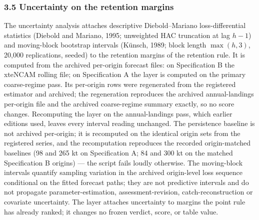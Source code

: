 \documentclass[11pt]{article}
\begin{document}
\subsubsection{3.5 Uncertainty on the retention
margins}\label{uncertainty-on-the-retention-margins}

The uncertainty analysis attaches descriptive Diebold--Mariano loss-differential statistics
(Diebold and Mariano, 1995; unweighted HAC truncation at lag \(h-1\)) and
moving-block bootstrap intervals (K\"unsch, 1989; block length
\(\max(h,3)\), 20,000 replications, seeded) to the retention margins of
the retention rule. It is computed from the archived per-origin forecast
files: on Specification B the xteNCAM rolling file; on Specification A
the layer is computed on the primary coarse-regime pass. Its per-origin
rows were regenerated from the registered estimator and archived; the
regeneration reproduces the archived annual-landings per-origin file
and the archived coarse-regime summary exactly, so no score changes.
Recomputing the layer on the annual-landings pass, which earlier
editions used, leaves every interval reading unchanged.
The persistence baseline is not archived per-origin; it is recomputed on the
identical origin sets from the registered series, and the recomputation
reproduces the recorded origin-matched baselines (98 and 265 kt on
Specification A; 84 and 300 kt on the matched Specification B origins)
--- the script fails loudly otherwise. The moving-block intervals quantify sampling variation in the archived
origin-level loss sequence conditional on the fitted forecast paths; they
are not predictive intervals and do not propagate parameter-estimation,
assessment-revision, catch-reconstruction or covariate uncertainty. The
layer attaches uncertainty to margins the point rule has already
ranked; it changes no frozen verdict,
score, or table value.
\end{document}
